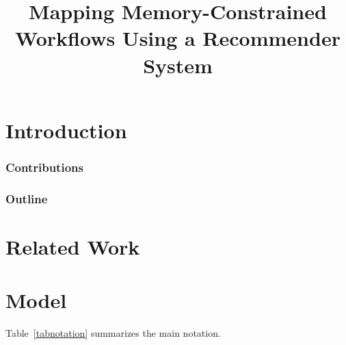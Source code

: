 \documentclass[11pt]{article}
\newcommand{\skug}[1]{{\color{blue}[SK: #1]}}
\begin{document}
    \title{Mapping Memory-Constrained Workflows Using a Recommender System}
%
    \maketitle

    \begin{abstract}
    \end{abstract}




    \section{Introduction}
    \label{sec:intro}




    \subsubsection*{Contributions}
    \subsubsection*{Outline}



    \section{Related Work}
    \label{sec:related-work}


    \section{Model}
    \label{sec:model}

    Table~\ref{tabnotation} summarizes the main notation. %
\end{document}
